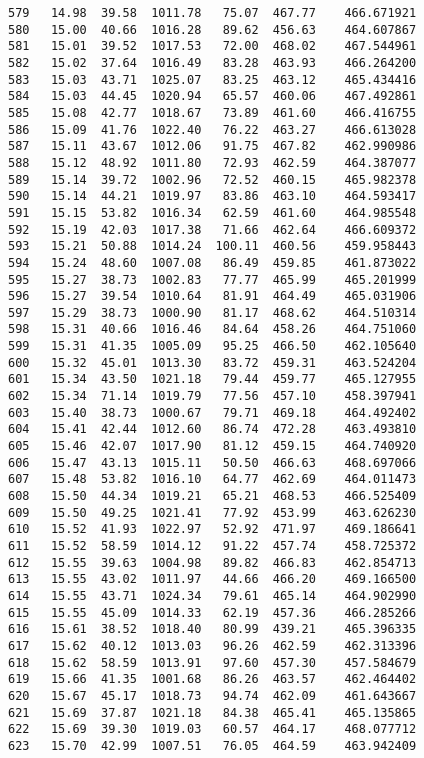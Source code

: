 \documentclass[11pt]{article}
\begin{document}
\begin{tcolorbox}[breakable, size=fbox, boxrule=.5pt, pad at break*=1mm, opacityfill=0]
\begin{Verbatim}[commandchars=\\\{\}]
579   14.98  39.58  1011.78   75.07  467.77    466.671921
580   15.00  40.66  1016.28   89.62  456.63    464.607867
581   15.01  39.52  1017.53   72.00  468.02    467.544961
582   15.02  37.64  1016.49   83.28  463.93    466.264200
583   15.03  43.71  1025.07   83.25  463.12    465.434416
584   15.03  44.45  1020.94   65.57  460.06    467.492861
585   15.08  42.77  1018.67   73.89  461.60    466.416755
586   15.09  41.76  1022.40   76.22  463.27    466.613028
587   15.11  43.67  1012.06   91.75  467.82    462.990986
588   15.12  48.92  1011.80   72.93  462.59    464.387077
589   15.14  39.72  1002.96   72.52  460.15    465.982378
590   15.14  44.21  1019.97   83.86  463.10    464.593417
591   15.15  53.82  1016.34   62.59  461.60    464.985548
592   15.19  42.03  1017.38   71.66  462.64    466.609372
593   15.21  50.88  1014.24  100.11  460.56    459.958443
594   15.24  48.60  1007.08   86.49  459.85    461.873022
595   15.27  38.73  1002.83   77.77  465.99    465.201999
596   15.27  39.54  1010.64   81.91  464.49    465.031906
597   15.29  38.73  1000.90   81.17  468.62    464.510314
598   15.31  40.66  1016.46   84.64  458.26    464.751060
599   15.31  41.35  1005.09   95.25  466.50    462.105640
600   15.32  45.01  1013.30   83.72  459.31    463.524204
601   15.34  43.50  1021.18   79.44  459.77    465.127955
602   15.34  71.14  1019.79   77.56  457.10    458.397941
603   15.40  38.73  1000.67   79.71  469.18    464.492402
604   15.41  42.44  1012.60   86.74  472.28    463.493810
605   15.46  42.07  1017.90   81.12  459.15    464.740920
606   15.47  43.13  1015.11   50.50  466.63    468.697066
607   15.48  53.82  1016.10   64.77  462.69    464.011473
608   15.50  44.34  1019.21   65.21  468.53    466.525409
609   15.50  49.25  1021.41   77.92  453.99    463.626230
610   15.52  41.93  1022.97   52.92  471.97    469.186641
611   15.52  58.59  1014.12   91.22  457.74    458.725372
612   15.55  39.63  1004.98   89.82  466.83    462.854713
613   15.55  43.02  1011.97   44.66  466.20    469.166500
614   15.55  43.71  1024.34   79.61  465.14    464.902990
615   15.55  45.09  1014.33   62.19  457.36    466.285266
616   15.61  38.52  1018.40   80.99  439.21    465.396335
617   15.62  40.12  1013.03   96.26  462.59    462.313396
618   15.62  58.59  1013.91   97.60  457.30    457.584679
619   15.66  41.35  1001.68   86.26  463.57    462.464402
620   15.67  45.17  1018.73   94.74  462.09    461.643667
621   15.69  37.87  1021.18   84.38  465.41    465.135865
622   15.69  39.30  1019.03   60.57  464.17    468.077712
623   15.70  42.99  1007.51   76.05  464.59    463.942409

\end{Verbatim}
\end{tcolorbox}
\end{document}
